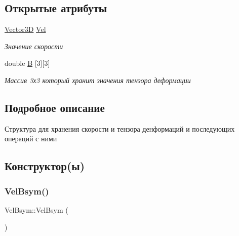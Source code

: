 \subsection*{Открытые атрибуты}
\begin{DoxyCompactItemize}
\item 
\mbox{\label{struct_vel_bsym_a97f0d61bcea631e8b3a6ebd38b15128c}} 
\mbox{\hyperlink{class_vector3_d}{Vector3D}} \mbox{\hyperlink{struct_vel_bsym_a97f0d61bcea631e8b3a6ebd38b15128c}{Vel}}
\begin{DoxyCompactList}\small\item\em Значение скорости \end{DoxyCompactList}\item 
\mbox{\label{struct_vel_bsym_af103456cc2074007e7a21214b38b59b9}} 
double \mbox{\hyperlink{struct_vel_bsym_af103456cc2074007e7a21214b38b59b9}{B}} \mbox{[}3\mbox{]}\mbox{[}3\mbox{]}
\begin{DoxyCompactList}\small\item\em Массив 3х3 который хранит значения тензора деформации \end{DoxyCompactList}\end{DoxyCompactItemize}


\subsection{Подробное описание}
Структура для хранения скорости и тензора денформаций и последующих операций с ними 

\subsection{Конструктор(ы)}
\mbox{\label{struct_vel_bsym_ab6d789ff036824176fd982ec3650d762}} 
\subsubsection{\texorpdfstring{Vel\+Bsym()}{VelBsym()}\hspace{0.1cm}{\footnotesize\ttfamily [1/3]}}
{\footnotesize\ttfamily Vel\+Bsym\+::\+Vel\+Bsym (\begin{DoxyParamCaption}{ }\end{DoxyParamCaption})}

